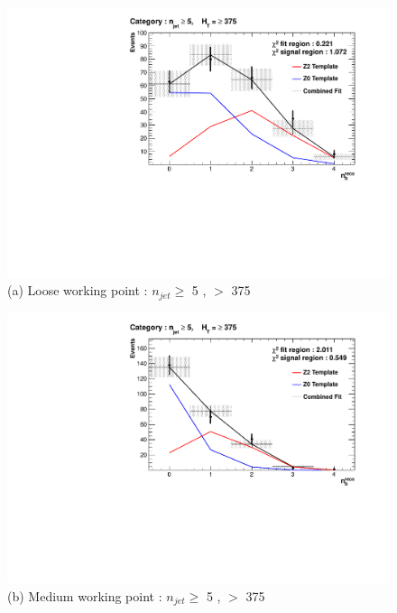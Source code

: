 \begin{figure}[ht]
\footnotesize
\centering
\begin{minipage}[b]{0.51\linewidth}
\includegraphics[width = 1.0\linewidth]{plots/TemplatesSignal/Final_Fit_To_Data_Normal_Loose_HTBin_Template_375_jet_mult_5.pdf}
\centering (a) Loose working point : $n_{jet} \geq$  5 , \theht $>$ 375
\end{minipage}
\footnotesize
\begin{minipage}[b]{0.51\linewidth}
\includegraphics[width = 1.0\linewidth]{plots/TemplatesSignal/Final_Fit_To_Data_Normal_Medium_HTBin_Template_375_jet_mult_5.pdf}
\centering (b) Medium working point : $n_{jet} \geq$ 5 , \theht $>$ 375 
\end{minipage}
\begin{minipage}[b]{0.51\linewidth}

\end{minipage}
\end{figure}
